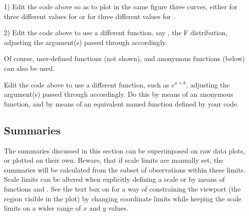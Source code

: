 \documentclass[krantz2]{krantz}\usepackage{knitr}%
\begin{document}
\begin{playground}
1) Edit the code above so as to plot in the same figure three curves, either for three different values for  or for three different values for .

2) Edit the code above to use a different function, say , the F distribution, adjusting the argument(s) passed through  accordingly.
\end{playground}

Of course, user-defined functions (not shown), and anonymous functions (below) can also be used.

\begin{knitrout}\footnotesize
{}\color{fgcolor}\begin{kframe}
\begin{alltt}
\hlstd{(}\hlstd{(} \hlstd{=} \hlopt{:}\hlstd{),} \hlstd{(}  \hlopt{+}
  \hlstd{(} \hlstd{=} \hlstd{(}\hlstd{,} \hlstd{,}  \hlopt{+}  \hlopt{*} \hlopt{^}\hlstd{\},}
                 \hlstd{=} \hlstd{(} \hlstd{=} \hlstd{,}  \hlstd{=} \hlstd{))}
\end{alltt}
\end{kframe}
\end{knitrout}

\begin{playground}
Edit the code above to use a different function, such as $e^{x + k}$, adjusting the argument(s) passed through  accordingly. Do this by means of an anonymous function, and by means of an equivalent named function defined by your code.
\end{playground}


\subsection{Summaries}\label{sec:plot:stat:summaries}
The summaries discussed in this section can be superimposed on raw data plots, or plotted on their own. Beware, that if scale limits are manually set, the summaries will be calculated from the subset of observations within these limits. Scale limits can be altered when explicitly defining a scale or by means of functions  and . See the text box on \pageref{box:plot:coord:lims} for a way of constraining the viewport (the region visible in the plot) by changing coordinate limits while keeping the scale limits on a wider range of $x$ and $y$ values.
\end{document}
